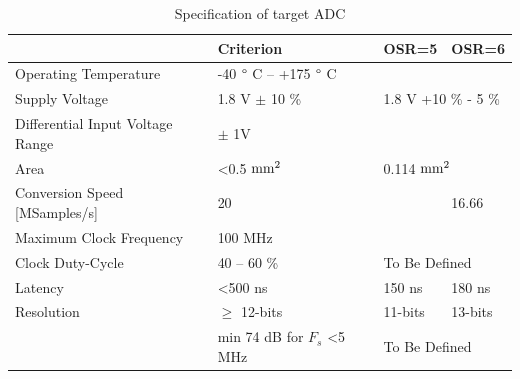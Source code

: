 \begin{table}[htp]
	\centering
	\caption{Specification of target ADC}
	\label{tbl:adc-spec-comp}
	\begin{tabular}{llll}
		\toprule
		& Criterion    & OSR=5 & OSR=6                                                                                                                                               \\ \midrule
		Operating Temperature            & \multicolumn{3}{1}{-40 $\degree$ C -- +175 $\degree$ C}                                                                                               \\
		Supply Voltage                   & 1.8 V $\pm$ 10 \%  & \multicolumn{2}{1}{1.8 V +10 \% - 5 \%}                                                                                                                           \\
		Differential Input Voltage Range & \multicolumn{3}{1}{$\pm$ 1V}                                                                                                                                       \\
		Area                             & \textless 0.5 \(\rm mm^2\) & \multicolumn{2}{1}{0.114 \(\rm mm^2\)}                                                                                                                                     \\
		Conversion Speed [MSamples/s]                 & \multicolumn{2}{1}{20} & 16.66                                                                                                                                              \\
		Maximum Clock Frequency          & \multicolumn{3}{1}{100 MHz}\\
		Clock Duty-Cycle                 & 40 -- 60 \% & \multicolumn{2}{1}{To Be Defined}                                                                                                                                                \\
		Latency                          & \textless 500 ns  & 150 ns & 180 ns                                                                                                                                                   \\
		Resolution                       & $\geq$ 12-bits  & 11-bits & 13-bits                                                                                        \\
		\rowcolor{white}\multirow{-1}{*}{SNDR }   & min 74 dB for $F_s$ \textless 5 MHz & \multicolumn{2}{1}{To Be Defined}\\

\end{tabular}
\end{table}
